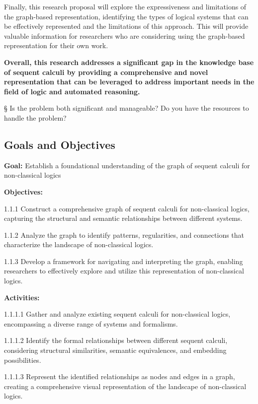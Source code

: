 Finally, this research proposal will explore the expressiveness and
limitations of the graph-based representation, identifying the types of
logical systems that can be effectively represented and the limitations
of this approach. This will provide valuable information for researchers
who are considering using the graph-based representation for their own
work.

\textbf{Overall, this research addresses a significant gap in the
knowledge base of sequent calculi by providing a comprehensive and novel
representation that can be leveraged to address important needs in the
field of logic and automated reasoning.}

§ Is the problem both significant and manageable? Do you have the
resources to handle the problem?

\hypertarget{goals-and-objectives}{%
\subsection{\texorpdfstring{\textbf{Goals and
Objectives}}{Goals and Objectives}}\label{goals-and-objectives}}

\textbf{Goal:} Establish a foundational understanding of the graph of
sequent calculi for non-classical logics

\textbf{Objectives:}

1.1.1 Construct a comprehensive graph of sequent calculi for
non-classical logics, capturing the structural and semantic
relationships between different systems.

1.1.2 Analyze the graph to identify patterns, regularities, and
connections that characterize the landscape of non-classical logics.

1.1.3 Develop a framework for navigating and interpreting the graph,
enabling researchers to effectively explore and utilize this
representation of non-classical logics.

\textbf{Activities:}

1.1.1.1 Gather and analyze existing sequent calculi for non-classical
logics, encompassing a diverse range of systems and formalisms.

1.1.1.2 Identify the formal relationships between different sequent
calculi, considering structural similarities, semantic equivalences, and
embedding possibilities.

1.1.1.3 Represent the identified relationships as nodes and edges in a
graph, creating a comprehensive visual representation of the landscape
of non-classical logics.


